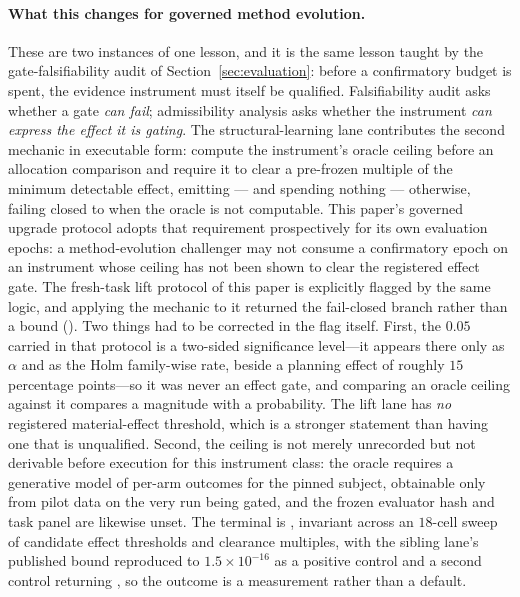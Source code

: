 \paragraph{What this changes for governed method evolution.}
These are two instances of one lesson, and it is the same lesson taught by the gate-falsifiability audit of Section~\ref{sec:evaluation}: before a confirmatory budget is spent, the evidence instrument must itself be qualified. Falsifiability audit asks whether a gate \emph{can fail}; admissibility analysis asks whether the instrument \emph{can express the effect it is gating}. The structural-learning lane contributes the second mechanic in executable form: compute the instrument's oracle ceiling before an allocation comparison and require it to clear a pre-frozen multiple of the minimum detectable effect, emitting  --- and spending nothing --- otherwise, failing closed to \CANNOTCHECK{} when the oracle is not computable. This paper's governed upgrade protocol adopts that requirement prospectively for its own evaluation epochs: a method-evolution challenger may not consume a confirmatory epoch on an instrument whose ceiling has not been shown to clear the registered effect gate. The fresh-task lift protocol of this paper is explicitly flagged by the same logic, and applying the mechanic to it returned the fail-closed branch rather than a bound (). Two things had to be corrected in the flag itself. First, the $0.05$ carried in that protocol is a two-sided significance level---it appears there only as $\alpha$ and as the Holm family-wise rate, beside a planning effect of roughly $15$ percentage points---so it was never an effect gate, and comparing an oracle ceiling against it compares a magnitude with a probability. The lift lane has \emph{no} registered material-effect threshold, which is a stronger statement than having one that is unqualified. Second, the ceiling is not merely unrecorded but not derivable before execution for this instrument class: the oracle requires a generative model of per-arm outcomes for the pinned subject, obtainable only from pilot data on the very run being gated, and the frozen evaluator hash and task panel are likewise unset. The terminal is , invariant across an $18$-cell sweep of candidate effect thresholds and clearance multiples, with the sibling lane's published bound reproduced to $1.5\times10^{-16}$ as a positive control and a second control returning , so the outcome is a measurement rather than a default.

